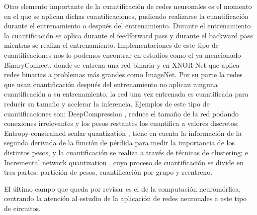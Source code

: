 Otro elemento importante de la cuantificación de redes neuronales es el momento en el que se aplican dichas cuantificaciones, pudiendo realizarse la cuantificación durante el entrenamiento o después del entrenamiento. Durante el entrenamiento la cuantificación se aplica durante el feedforward pass y durante el backward pass mientras se realiza el entrenamiento. Implementaciones de este tipo de cuantificaciones nos lo podemos encontrar en estudios como el ya mencionado BinaryConnect, donde se entrena una red binaria y en XNOR-Net \cite{Rastegari2016XNORNetIC} que aplica redes binarias a problemas más grandes como ImageNet. Por su parte la redes que usan cuantificación después del entrenamiento no aplican ninguna cuantificación a su entrenamiento, la red una vez entrenada es cuantificada para reducir su tamaño y acelerar la inferencia. Ejemplos de este tipo de cuantificaciones son: DeepCompression \cite{DBLP:journals/corr/HanMD15}, reduce el tamaño de la red podando conexiones irrelevantes y los pesos restantes los cuantifica a valores discretos; Entropy-constrained scalar quantization \cite{DBLP:conf/iclr/ChoiEL17}, tiene en cuenta la información de la segunda derivada de la función de pérdida para medir la importancia de los distintos pesos, y la cuantificación se realiza a través de técnicas de clustering; e Incremental network quantization \cite{DBLP:journals/corr/ZhouYGXC17}, cuyo proceso de cuantificación se divide en tres partes: partición de pesos, cuantificación por grupo y reentreno. \cite{https://doi.org/10.48550/arxiv.1808.04752}

El último campo que queda por revisar es el de la computación neuromórfica, centrando la atención al estudio de la aplicación de redes neuronales a este tipo de circuitos. 

